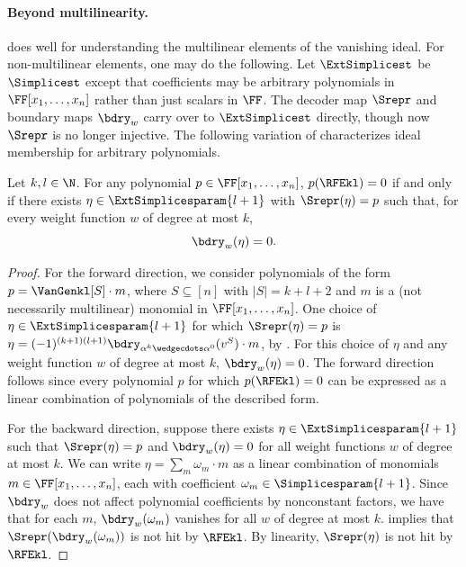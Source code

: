 \paragraph{Beyond multilinearity.}
does well for understanding the multilinear elements of the vanishing ideal.
For non-multilinear elements, one may do the following.
Let \(\ExtSimplicest\) be \(\Simplicest\) except that coefficients may be
arbitrary polynomials in \(\FF[x_1,\ldots,x_n]\) rather than just scalars in
\(\FF\).
The decoder map \(\Srepr\) and boundary maps \(\bdry_w\) carry over
to \(\ExtSimplicest\) directly,
though now \(\Srepr\) is no longer injective.
The following variation of 
characterizes ideal membership for arbitrary polynomials.
\begin{proposition}
  \label{prop.vanideal-char.base-lift}
  Let \(k,l \in \N\).
  For any polynomial \(p\in\FF[x_1,\ldots,x_n]\),
  \(p(\RFEkl) = 0\) if and only if
  there exists \(\eta\in\ExtSimplicesparam{l+1}\)
  with \(\Srepr(\eta) = p\) such that,
  for every weight function $w$ of degree at most \(k\),
  \[
    \bdry_w(\eta) = 0.
  \]
\end{proposition}

\begin{proof}
    For the forward direction, we consider polynomials of the form $p= \VanGenkl[S] \cdot m$, where $S \subseteq [n]$ with $|S|=k+l+2$ and $m$ is a (not necessarily multilinear) monomial in $\FF[x_1,\dots,x_n]$. One choice of $\eta\in \ExtSimplicesparam{l+1}$ for which $\Srepr(\eta)=p$ is $\eta=(-1)^{(k+1)(l+1)} \bdry_{\alpha^k\wedgecdots\alpha^0}(v^S) \cdot m$, by . For this choice of $\eta$ and any weight function $w$ of degree at most $k$, $\bdry_{w}(\eta)=0$. The forward direction follows since every polynomial $p$ for which $p(\RFEkl)=0$ can be expressed as a linear combination of polynomials of the described form.

    For the backward direction, suppose there exists $\eta\in \ExtSimplicesparam{l+1}$ such that $\Srepr(\eta)=p$ and $\bdry_w(\eta)=0$ for all weight functions $w$ of degree at most $k$. We can write $\eta = \sum_m \omega_m 
    \cdot m$ as a linear combination of monomials $m\in \FF[x_1,\dots,x_n]$, each with coefficient $\omega_m\in \Simplicesparam{l+1}$. Since $\bdry_w$ does not affect polynomial coefficients by nonconstant factors, we have that for each $m$, $\bdry_w(\omega_m)$ vanishes for all $w$ of degree at most $k$.  implies that $\Srepr(\bdry_w(\omega_m))$ is not hit by $\RFEkl$. By linearity, $\Srepr(\eta)$ is not hit by $\RFEkl$.
\end{proof}

